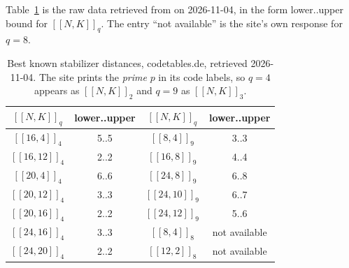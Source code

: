 Table~\ref{tab:grassl} is the raw data retrieved from
\cite{GrasslCodetables} on 2026-11-04, in the form lower..upper bound for
$[[N,K]]_q$. The entry ``not available'' is the site's own response for
$q=8$.

\begin{table}[h]
\centering
\caption{Best known stabilizer distances, codetables.de, retrieved
2026-11-04. The site prints the \emph{prime} $p$ in its code labels, so
$q=4$ appears as $[[N,K]]_2$ and $q=9$ as $[[N,K]]_3$.}
\label{tab:grassl}
\begin{tabular}{@{}cc@{\qquad}cc@{}}\toprule
$[[N,K]]_q$ & lower..upper & $[[N,K]]_q$ & lower..upper\\\midrule
$[[16,4]]_4$   & 5..5  & $[[8,4]]_9$   & 3..3\\
$[[16,12]]_4$  & 2..2  & $[[16,8]]_9$  & 4..4\\
$[[20,4]]_4$   & 6..6  & $[[24,8]]_9$  & 6..8\\
$[[20,12]]_4$  & 3..3  & $[[24,10]]_9$ & 6..7\\
$[[20,16]]_4$  & 2..2  & $[[24,12]]_9$ & 5..6\\
$[[24,16]]_4$  & 3..3  & $[[8,4]]_8$   & not available\\
$[[24,20]]_4$  & 2..2  & $[[12,2]]_8$  & not available\\
\bottomrule
\end{tabular}
\end{table}
